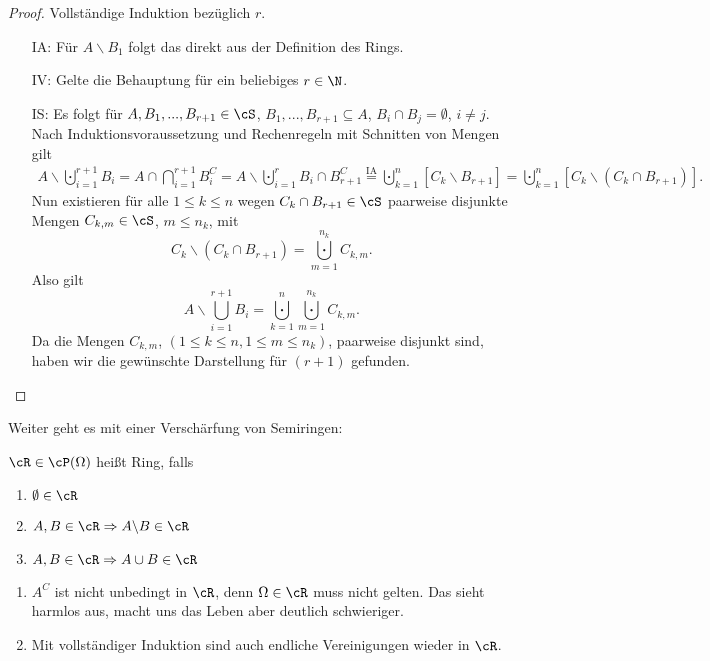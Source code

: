 \begin{proof}
	Vollständige Induktion bezüglich $r$. \begin{itemize}
		\item [IA:] Für $A \backslash B_1$ folgt das direkt aus der Definition des Rings.
		\item [IV:] Gelte die Behauptung für ein beliebiges $r \in \N$.
		\item [IS:] Es folgt für $A,B_1,...,B_{r+1} \in \cS$, $B_1,...,B_{r+1} \subseteq A$, $B_i \cap B_j = \emptyset$, $i \neq j$. Nach Induktionsvoraussetzung und Rechenregeln mit Schnitten von Mengen gilt
		\begin{gather*}
		A \backslash \bigcupdot\limits_{i = 1}^{r+1} B_i = A\cap  \bigcap_{i=1}^{r+1} B_i^C = A\backslash \bigcupdot_{i=1}^r B_i \cap B_{r+1}^C \overset{\text{IA}}{=} \bigcupdot\limits_{k = 1}^{n} [C_k \backslash B_{r + 1}] = \bigcupdot\limits_{k = 1}^{n} [C_k \backslash (C_k \cap B_{r + 1})].
		\end{gather*}
		Nun existieren für alle $1 \leq k \leq n$ wegen $C_k \cap B_{r + 1} \in \cS$ paarweise disjunkte Mengen $C_{k,m} \in \cS$, $m \leq n_k$, mit 
		\[ C_k \backslash (C_k \cap B_{r + 1}) = \bigcupdot\limits_{m = 1}^{n_k} C_{k,m}. \]
		Also gilt \[
		A \backslash \bigcup\limits_{i = 1}^{r+1} B_i = \bigcupdot\limits_{k = 1}^{n} \bigcupdot\limits_{m = 1}^{n_k} C_{k,m}. \]
		Da die Mengen $C_{k,m}$, $(1 \leq k \leq n, 1 \leq m \leq n_k)$, paarweise disjunkt sind, haben wir die gewünschte Darstellung für $(r+1)$ gefunden.
	\end{itemize}
\end{proof}
Weiter geht es mit einer Versch\"arfung von Semiringen:
\begin{deff}\label{Ring}
	$\cR \in \cP(\Omega)$ heißt Ring, falls
	\begin{enumerate}[label=(\roman*)]
		\item $\emptyset \in \cR$
		\item $A, B \in \cR \Rightarrow A \backslash B \in \cR$
		\item $A,B \in \cR \Rightarrow A \cup B \in \cR$
	\end{enumerate}
\end{deff}

\begin{bem1} \abs
	\begin{enumerate}[label=(\roman*)]
		\item $A^C$ ist nicht unbedingt in $\cR$, denn $\Omega \in \cR$ muss nicht gelten. Das sieht harmlos aus, macht uns das Leben aber deutlich schwieriger.
		\item Mit vollständiger Induktion sind auch endliche Vereinigungen wieder in $\cR$.
	\end{enumerate}
\end{bem1}